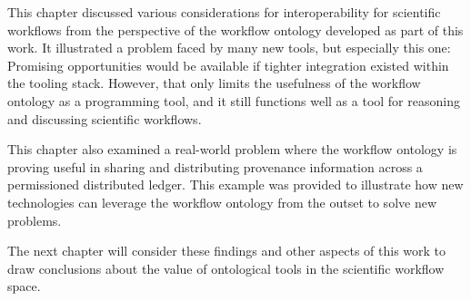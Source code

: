 This chapter discussed various considerations for interoperability for
scientific workflows from the perspective of the workflow ontology developed as
part of this work. It illustrated a problem faced by many new tools, but
especially this one: Promising opportunities would be available if tighter
integration existed within the tooling stack. However, that only limits the
usefulness of the workflow ontology as a programming tool, and it still
functions well as a tool for reasoning and discussing scientific workflows. 

This chapter also examined a real-world problem where the workflow ontology is
proving useful in sharing and distributing provenance information across a
permissioned distributed ledger. This example was provided to illustrate how new
technologies can leverage the workflow ontology from the outset to solve new
problems. 

The next chapter will consider these findings and other aspects of this work to
draw conclusions about the value of ontological tools in the scientific workflow
space.
